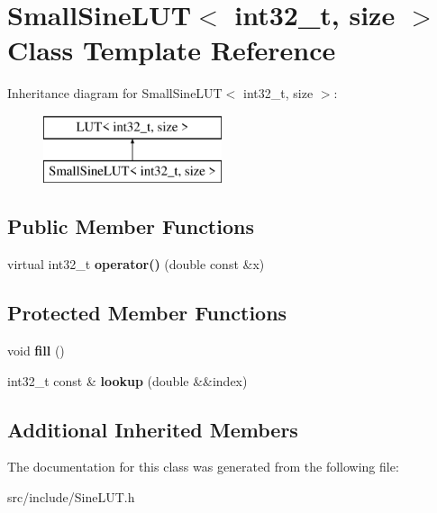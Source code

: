 \hypertarget{class_small_sine_l_u_t_3_01int32__t_00_01size_01_4}{\section{Small\+Sine\+L\+U\+T$<$ int32\+\_\+t, size $>$ Class Template Reference}
\label{class_small_sine_l_u_t_3_01int32__t_00_01size_01_4}
}
Inheritance diagram for Small\+Sine\+L\+U\+T$<$ int32\+\_\+t, size $>$\+:\begin{figure}[H]
\begin{center}
\leavevmode
\includegraphics[height=2.000000cm]{class_small_sine_l_u_t_3_01int32__t_00_01size_01_4}
\end{center}
\end{figure}
\subsection*{Public Member Functions}
\begin{DoxyCompactItemize}
\item 
\hypertarget{class_small_sine_l_u_t_3_01int32__t_00_01size_01_4_a58b9060f20f715cb7f0a043195387b88}{virtual int32\+\_\+t {\bfseries operator()} (double const \&x)}\label{class_small_sine_l_u_t_3_01int32__t_00_01size_01_4_a58b9060f20f715cb7f0a043195387b88}

\end{DoxyCompactItemize}
\subsection*{Protected Member Functions}
\begin{DoxyCompactItemize}
\item 
\hypertarget{class_small_sine_l_u_t_3_01int32__t_00_01size_01_4_a018260f4969b77ba260b4cd2e7624d1d}{void {\bfseries fill} ()}\label{class_small_sine_l_u_t_3_01int32__t_00_01size_01_4_a018260f4969b77ba260b4cd2e7624d1d}

\item 
\hypertarget{class_small_sine_l_u_t_3_01int32__t_00_01size_01_4_aaad06064d1d401b4c9d42837bc856958}{int32\+\_\+t const \& {\bfseries lookup} (double \&\&index)}\label{class_small_sine_l_u_t_3_01int32__t_00_01size_01_4_aaad06064d1d401b4c9d42837bc856958}

\end{DoxyCompactItemize}
\subsection*{Additional Inherited Members}


The documentation for this class was generated from the following file\+:\begin{DoxyCompactItemize}
\item 
src/include/Sine\+L\+U\+T.\+h\end{DoxyCompactItemize}
